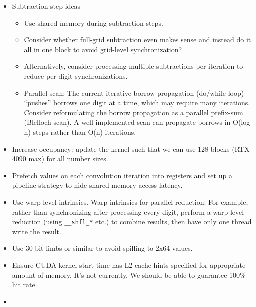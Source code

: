\documentclass[12pt]{article}
\begin{document}
\begin{itemize}
\item Subtraction step ideas
    \begin{itemize}
    \item Use shared memory during subtraction steps.
    \item Consider whether full-grid subtraction even makes sense and instead do it all in one block to avoid grid-level synchronization?
    \item Alternatively, consider processing multiple subtractions per iteration to reduce per-digit synchronizations.
    \item Parallel scan:  The current iterative borrow propagation (do/while loop) ``pushes'' borrows one digit at a time, which may require many iterations. Consider reformulating the borrow propagation as a parallel prefix-sum (Blelloch scan). A well-implemented scan can propagate borrows in O(log n) steps rather than O(n) iterations.
\end{itemize}
\item Increase occupancy: update the kernel such that we can use 128 blocks (RTX 4090 max) for all number sizes.
\item Prefetch values on each convolution iteration into registers and set up a pipeline strategy to hide shared memory access latency.
\item Use warp-level intrinsics.  Warp intrinsics for parallel reduction: For example, rather than synchronizing after processing every digit, perform a warp-level reduction (using \verb|__shfl_*| etc.) to combine results, then have only one thread write the result.
\item Use 30-bit limbs or similar to avoid spilling to 2x64 values.
\item Ensure CUDA kernel start time has L2 cache hints specified for appropriate amount of memory.  It's not currently.  We should be able to guarantee 100\% hit rate.
\item 
\end{itemize}
\end{document}
